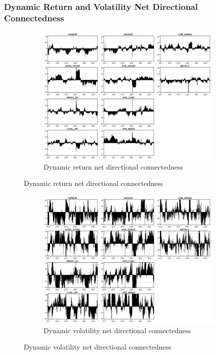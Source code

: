 \documentclass[preprint, 3p,
authoryear]{elsarticle} %
\begin{document}
\begin{landscape}
\subsubsection{Dynamic Return and Volatility Net Directional Connectedness}

\begin{figure}[H]
  \caption{Dynamic Net Directional Connectedness (Jan 2013 – Jan 2025)}
    \centering
      \begin{subfigure}[a]{\textwidth}
        \caption{Dynamic return net directional connectedness}
        \includegraphics[width = 1.25\linewidth]{29aApdxD-12-220-RetNDC}
      \end{subfigure}
\end{figure}
\begin{figure}[H]
  \ContinuedFloat
  \centering
      \begin{subfigure}[b]{\textwidth}
        \caption{Dynamic volatility net directional connectedness}
        \includegraphics[width = 1.25\linewidth]{29bApdxD-12-220-VolNDC}
      \end{subfigure}
\end{figure}




\end{landscape}
\end{document}
